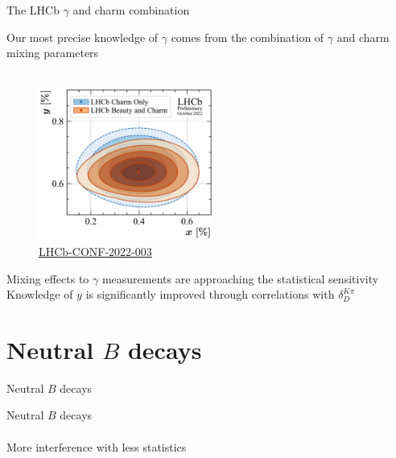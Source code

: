 \documentclass[dvipsnames]{beamer}
\begin{document}
\begin{frame}{The LHCb $\gamma$ and charm combination}
  \begin{center}
    {\Large Our most precise knowledge of $\gamma$ comes from the combination of $\gamma$ and charm mixing parameters}\\~\\
  \end{center}
  \vspace{-0.5cm}
  \begin{figure}
    \includegraphics[height=5.0cm]{Plots/gammacharm_lhcb_xD_yD.pdf}
    \vspace{-0.5cm}
    \caption*{\tiny\href{https://lhcbproject.web.cern.ch/Publications/LHCbProjectPublic/LHCb-CONF-2022-003.html}{LHCb-CONF-2022-003}}
  \end{figure}
  \vspace{-0.5cm}
  \begin{center}
    Mixing effects to $\gamma$ measurements are approaching the statistical sensitivity\\
    Knowledge of $y$ is significantly improved through correlations with $\delta_D^{K\pi}$
  \end{center}
\end{frame}

\section{Neutral \texorpdfstring{$B$}{B} decays}
\begin{frame}{Neutral $B$ decays}
  \begin{center}
    {\huge Neutral $B$ decays} \\~\\
    {\large More interference with less statistics}
  \end{center}
\end{frame}
\end{document}
